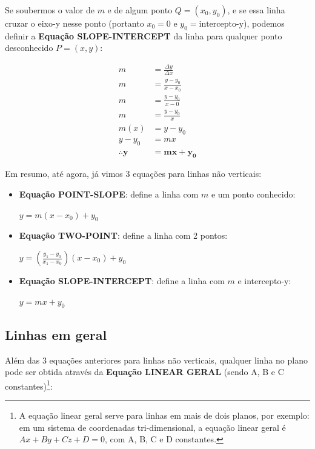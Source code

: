 \documentclass[pdftex, brazil, 12pt, twoside]{article}
\begin{document}
Se soubermos o valor de $m$ e de algum ponto $Q=(x_0, y_0)$, e se essa linha cruzar
o eixo-y nesse ponto (portanto $x_0 = 0$ e $y_0 = \text{intercepto-y}$), podemos definir a
\textbf{Equação SLOPE-INTERCEPT} da linha para qualquer ponto
desconhecido $P=(x, y)$:

\begin{equation}
  \begin{split}
    m & = \frac{\Delta y}{\Delta x}\\
    m & = \frac{y - y_0}{x - x_0}\\
    m & = \frac{y - y_0}{x - 0}\\
    m & = \frac{y - y_0}{x}\\
    m(x) & = y - y_0\\
    y - y_0 & = mx\\
    \bm{\therefore y} & \bm{= mx + y_0}
  \end{split}
\end{equation}

Em resumo, até agora, já vimos 3 equações para linhas não verticais:

\begin{itemize}
\item \textbf{Equação POINT-SLOPE}: define a linha com $m$ e um ponto conhecido:

  $y = m(x - x_0) + y_0$
\item \textbf{Equação TWO-POINT}: define a linha com 2 pontos:

  $y = \left(\frac{y_1 - y_0}{x_1 - x_0}\right)(x - x_0) + y_0$
\item \textbf{Equação SLOPE-INTERCEPT}: define a linha com $m$ e intercepto-y:

  $y = mx + y_0$
\end{itemize}

\subsection{Linhas em geral}
\label{modelagem-linear-linhas-gerais}

Além das 3 equações anteriores para linhas não verticais, qualquer linha no
plano pode ser obtida através da \textbf{Equação LINEAR GERAL} (sendo A, B e C constantes)\footnote{A equação
  linear geral serve para linhas em mais de dois planos, por exemplo: em um sistema de coordenadas
  tri-dimensional, a equação linear geral é $Ax + By + Cz + D = 0$, com A, B, C e D constantes.}:
\end{document}
